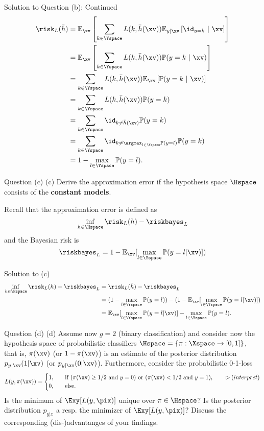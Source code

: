\documentclass[aspectratio=169]{beamer}
\newcommand{\Ex}{\mathbb{E}_{\xv}}
\newcommand{\Eyx}{\mathbb{E}_{y|\xv}}
\newcommand{\Prob}{\mathbb{P}}
\begin{document}
\begin{frame}{Solution to Question (b): Continued}
	\small
	\begin{align*}
		\risk_L(\bar{h})
		&= \Ex\left[ \sum_{k \in \Yspace} L(k, \bar{h}(\xv)) \Eyx \left[\id_{y=k}  \ | \ \xv \right] \right] \\
		&= \Ex\left[ \sum_{k \in \Yspace} L(k, \bar{h}(\xv)) \Prob(y = k \ | \ \xv) \right] \\
		&= \sum_{k \in \Yspace} L(k, \bar{h}(\xv)) \Ex \left[ \Prob(y = k \ | \ \xv) \right] \\
		& = \sum_{k \in \Yspace} L(k, \bar{h}(\xv)) \Prob(y = k) \\
		&= \sum_{k \in \Yspace} \id_{k \neq \bar{h}(\xv)} \Prob(y=k) \\
		&=  \sum_{k \in \Yspace} \id_{k \neq \argmax_{l \in \Yspace} \Prob(y=l)} \Prob(y=k) \\
		&= 1 - \max_{l \in \Yspace} \Prob(y=l).
	\end{align*}
\end{frame}

\begin{frame}{Question (c)}
	(c) Derive the approximation error if the hypothesis space $\Hspace$ consists of the \textbf{constant models}.
	\vspace{10pt}
	
	Recall that the approximation error is defined as 
	$$\inf_{h \in \Hspace} \risk_L(h) - \riskbayes_L$$
	and the Bayesian risk is 
	$$\riskbayes_L = 1 - \Ex[\max_{l \in \Yspace} \Prob(y = l | \xv)])$$
\end{frame}

\begin{frame}{Solution to (c)}
	\begin{align*}
		\inf_{h \in \Hspace} \risk_L(h) - \riskbayes_L 
		&= \risk_L(\bar{h}) - \riskbayes_L \\
		&= (1 - \max_{l \in \Yspace} \Prob(y=l)) - (1 - \Ex[\max_{l \in \Yspace} \Prob(y = l | \xv)]) \\
		&= \Ex[\max_{l \in \Yspace} \Prob(y = l | \xv)] - \max_{l \in \Yspace} \Prob(y=l).
	\end{align*}
\end{frame}

\begin{frame}{Question (d)}
	(d) Assume now $g=2$ (binary classification) and consider now the hypothesis space of probabilistic classifiers $\Hspace = \{\pi: \Xspace \to [0, 1] \}$, that is, $\pi(\xv)$ (or $1 - \pi(\xv)$) is an estimate of the posterior distribution $p_{y | \xv} (1 | \xv)$ (or $p_{y | \xv} (0 | \xv)$). Furthermore, consider the probabilistic 0-1-loss
	$$
	L(y, \pi(\xv)) = \begin{cases}
		1, \quad & \text{if ($\pi(\xv) \geq 1/2$ and $y=0$) or ($\pi(\xv) < 1/ 2$ and $y = 1$),} \qquad \rhd(interpret)\\
		0, \quad & \text{else.}
	\end{cases}
	$$
	Is the minimum of $\Exy[L(y, \pix)]$ unique over $\pi \in \Hspace$? Is the posterior distribution $p_{y|x}$ a resp. the minimizer of $\Exy[L(y, \pix)]$? Discuss the corresponding (dis-)advantanges of your findings.
\end{frame}
\end{document}
